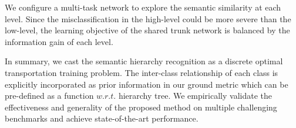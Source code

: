 \documentclass{article}
\theoremstyle{plain}%
\begin{document}
 
We configure a multi-task network to explore the semantic similarity at each level. Since the misclassification in the high-level could be more severe than the low-level, the learning objective of the shared trunk network is balanced by the information gain \cite{deng2012hedging} of each level.



In summary, we cast the semantic hierarchy recognition as a discrete optimal transportation training problem. The inter-class relationship of each class is explicitly incorporated as prior information in our ground metric which can be pre-defined as a function $w.r.t.$ hierarchy tree. We empirically validate the effectiveness and generality of the proposed method on multiple challenging benchmarks and achieve state-of-the-art performance.













\end{document}
